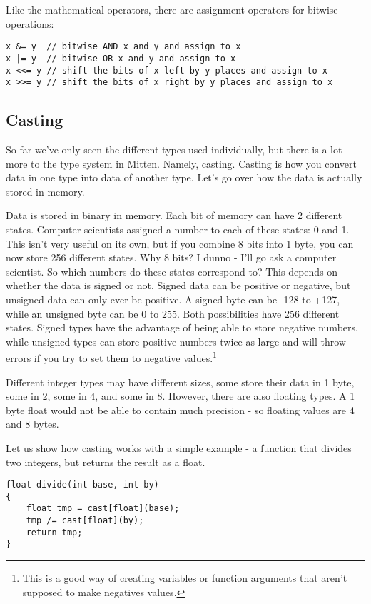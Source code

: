 \documentclass[10pt,a4paper]{article}
\begin{document}
Like the mathematical operators, there are assignment operators for bitwise operations:
\begin{verbatim}
x &= y  // bitwise AND x and y and assign to x
x |= y  // bitwise OR x and y and assign to x
x <<= y // shift the bits of x left by y places and assign to x
x >>= y // shift the bits of x right by y places and assign to x
\end{verbatim}

\newpage





\subsection{Casting}
So far we've only seen the different types used individually, but there is a lot more to the type system in Mitten. Namely, casting. Casting is how you convert data in one type into data of another type. Let's go over how the data is actually stored in memory.

Data is stored in binary in memory. Each bit of memory can have 2 different states. Computer scientists assigned a number to each of these states: 0 and 1. This isn't very useful on its own, but if you combine 8 bits into 1 byte, you can now store 256 different states. Why 8 bits? I dunno - I'll go ask a computer scientist. So which numbers do these states correspond to? This depends on whether the data is signed or not. Signed data can be positive or negative, but unsigned data can only ever be positive. A signed byte can be -128 to +127, while an unsigned byte can be 0 to 255. Both possibilities have 256 different states. Signed types have the advantage of being able to store negative numbers, while unsigned types can store positive numbers twice as large and will throw errors if you try to set them to negative values.\footnote{This is a good way of creating variables or function arguments that aren't supposed to make negatives values.}

Different integer types may have different sizes, some store their data in 1 byte, some in 2, some in 4, and some in 8. However, there are also floating types. A 1 byte float would not be able to contain much precision - so floating values are 4 and 8 bytes.

Let us show how casting works with a simple example - a function that divides two integers, but returns the result as a float.
\begin{verbatim}
float divide(int base, int by)
{
    float tmp = cast[float](base);
    tmp /= cast[float](by);
    return tmp;
}
\end{verbatim}
\end{document}
